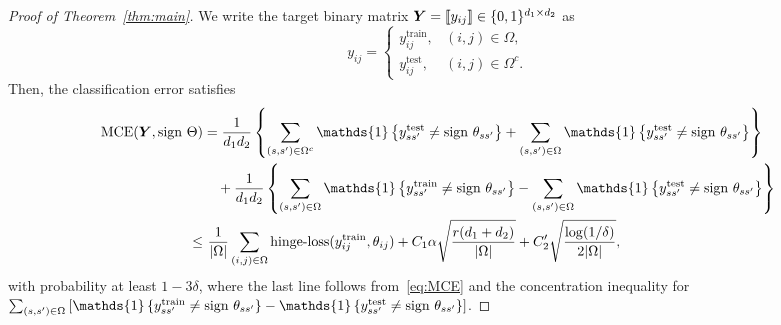 \documentclass[11pt]{article}
\theoremstyle{plain}
\theoremstyle{definition}
\def\sign{\textup{sign }}
\begin{document}
\begin{proof}[Proof of Theorem~\ref{thm:main}]
We write the target binary matrix $\bm Y=\llbracket y_{ij} \rrbracket\in\{0,1\}^{d_1\times d_2}$ as
\[
y_{ij} =\begin{cases}
y^{\text{train}}_{ij},& (i,j)\in \Omega,\\
y^{\text{test}}_{ij},& (i,j)\in \Omega^c.
\end{cases}
\]
Then, the classification error satisfies
\begin{align}\label{eq:last}
\textup{MCE}(\mY, \sign \Theta)&=
{1\over d_1d_2}\left\{\sum_{(s,s')\in\Omega^c}\mathds{1}\left\{y^{\text{test}}_{ss'}\neq \sign \theta_{ss'}\right\} + \sum_{(s,s')\in\Omega}\mathds{1}\left\{y^{\text{test}}_{ss'}\neq \sign \theta_{ss'}\right\}\right\} \notag\\
 & \quad + {1\over d_1d_2}\left\{\sum_{(s,s')\in\Omega}\mathds{1}\left\{y^{\text{train}}_{ss'}\neq \sign \theta_{ss'}\right\}-\sum_{(s,s')\in\Omega}\mathds{1}\left\{y^{\text{test}}_{ss'}\neq \sign
\theta_{ss'}\right\}  \right\}\notag\\
\leq &\ {1\over |\Omega|}\sum_{(i,j)\in\Omega}\text{hinge-loss}(y^{\text{train}}_{ij}, \theta_{ij}) + C_1\alpha\sqrt{r(d_1+d_2)\over |\Omega|} + C'_2\sqrt{\log(1/\delta)\over 2|\Omega|},
\end{align}
with probability at least $1-3\delta$, where the last line follows from~\eqref{eq:MCE} and the concentration inequality for $\sum_{(s,s')\in\Omega}\left[\mathds{1}\left\{y^{\text{train}}_{ss'}\neq \sign \theta_{ss'}\right\}-\mathds{1}\left\{y^{\text{test}}_{ss'}\neq \sign \theta_{ss'}\right\}\right]$. 
\end{proof}



\end{document}

